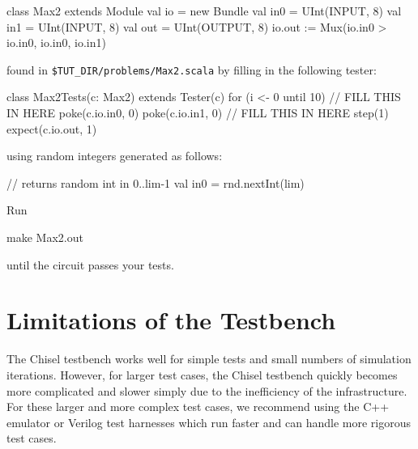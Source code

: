 \begin{scala}
class Max2 extends Module {
  val io = new Bundle {
    val in0 = UInt(INPUT,  8)
    val in1 = UInt(INPUT,  8)
    val out = UInt(OUTPUT, 8)
  }
  io.out := Mux(io.in0 > io.in0, io.in0, io.in1)
}
\end{scala}

\noindent
found in \verb+$TUT_DIR/problems/Max2.scala+ by filling in the following tester:

\begin{scala}
class Max2Tests(c: Max2) extends Tester(c) {
  for (i <- 0 until 10) {
    // FILL THIS IN HERE
    poke(c.io.in0, 0)
    poke(c.io.in1, 0)
    // FILL THIS IN HERE
    step(1)
    expect(c.io.out, 1)
  }
}
\end{scala}

\noindent 
using random integers generated as follows:

\begin{scala}
// returns random int in 0..lim-1
val in0 = rnd.nextInt(lim) 
\end{scala}

\noindent
Run 

\begin{bash}
make Max2.out
\end{bash}

\noindent 
until the circuit passes your tests.

\section{Limitations of the Testbench}

The Chisel testbench works well for simple tests and small numbers of simulation iterations. However, for larger test cases, the Chisel testbench quickly becomes more complicated and slower simply due to the inefficiency of the infrastructure. For these larger and more complex test cases, we recommend using the C++ emulator or Verilog test harnesses which run faster and can handle more rigorous test cases.

